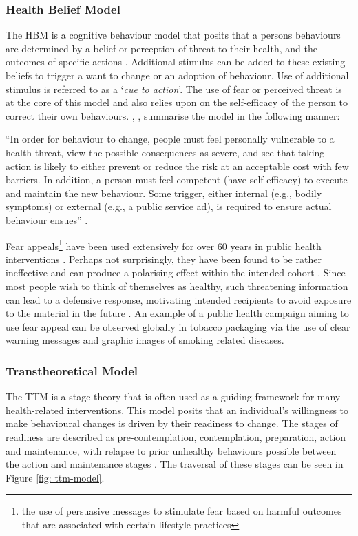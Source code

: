 \subsubsection{Health Belief Model}
The HBM is a cognitive behaviour model that posits that a persons behaviours are determined by a belief or perception of threat to their health, and the outcomes of specific actions \cite{Morris2012a}. Additional stimulus can be added to these existing beliefs to trigger a want to change or an adoption of behaviour. Use of additional stimulus is referred to as a `\textit{cue to action}'. The use of fear or perceived threat is at the core of this model and also relies upon on the self-efficacy of the person to correct their own behaviours. \citeauthor{Nisbet2008}, \citeyear{Nisbet2008}, summarise the model in the following manner:
\begin{displayquote}
	``In order for behaviour to change, people must feel personally vulnerable to a health threat, view the possible consequences as severe, and see that taking action is likely to either prevent or reduce the risk at an acceptable cost with few barriers. In addition, a person must feel competent (have self-efficacy) to execute and maintain the new behaviour. Some trigger, either internal (e.g., bodily symptoms) or external (e.g., a public service ad), is required to ensure actual behaviour ensues'' \cite{Nisbet2008}.
\end{displayquote}

Fear appeals\footnote{the use of persuasive messages to stimulate fear based on harmful outcomes that are associated with certain lifestyle practices} have been used extensively for over 60 years in public health interventions \cite{Ruiter2014, Rice2012}. Perhaps not surprisingly, they have been found to be rather ineffective and can produce a polarising effect within the intended cohort \cite{Ruiter2014}. Since most people wish to think of themselves as healthy, such threatening information can lead to a defensive response, motivating intended recipients to avoid exposure to the material in the future \cite{Ruiter2014}. An example of a public health campaign aiming to use fear appeal can be observed globally in tobacco packaging via the use of clear warning messages and graphic images of smoking related diseases.

\subsubsection{Transtheoretical Model}
The TTM is a stage theory that is often used as a guiding framework for many health-related interventions. This model posits that an individual’s willingness to make behavioural changes is driven by their readiness to change. The stages of readiness are described as pre-contemplation, contemplation, preparation, action and maintenance, with relapse to prior unhealthy behaviours possible between the action and maintenance stages \cite{Prochaska2005}. The traversal of these stages can be seen in Figure \ref{fig: ttm-model}.


